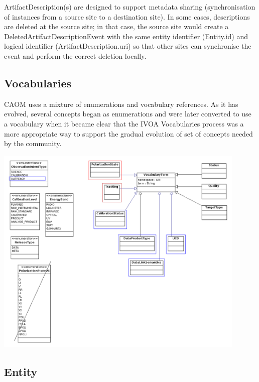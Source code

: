 \documentclass[11pt,a4paper]{ivoa}
\begin{document}
ArtifactDescription(s) are designed to support metadata sharing (synchronisation of instances
from a source site to a destination site). In some cases, descriptions are deleted at the 
source site; in that case, the source site would create a DeletedArtifactDescriptionEvent with 
the same entity identifier (Entity.id) and logical identifier (ArtifactDescription.uri) so that 
other sites can synchronise the event and perform the correct deletion locally.

\subsection{Vocabularies}

CAOM uses a mixture of enumerations and vocabulary references. As it has evolved,
several concepts began as enumerations and were later converted to use a vocabulary
when it became clear that the IVOA Vocabularies process was a more appropriate way
to support the gradual evolution of set of concepts needed by the community.

\begin{center}
\centering
\includegraphics[width=0.9\textwidth]{src/uml/CAOM3vocabularies.png}
\label{fig:vocab}
\end{center}

\subsection{Entity}
\end{document}
